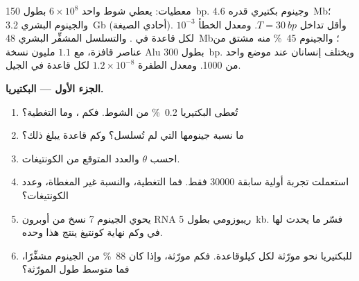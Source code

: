 \begin{problem}
\label{pb:b3:genomics:1}
معطيات: يعطي شوط واحد $6\times 10^{8}$  بطول \qty{150}{bp}.
وجينوم بكتيري قدره \qty{4.6}{Mb}؛ والجينوم البشري \qty{3.2}{Gb}
(أحادي الصيغة). وأقل تداخل $T = \qty{30}{bp}$. ومعدل الخطأ $10^{-3}$
لكل قاعدة في . والتسلسل المشفِّر البشري \qty{48}{Mb}؛ والجينوم
\qty{45}{\%} منه مشتق من عناصر قافزة، مع $1.1$ مليون نسخة Alu بطول
\qty{300}{bp}. ويختلف إنسانان عند موضع واحد من \num{1000}. ومعدل
الطفرة $1.2\times 10^{-8}$ لكل قاعدة في الجيل.

\medskip
\noindent\textbf{الجزء الأول --- البكتيريا.}
\begin{enumerate}
  \item تُعطى البكتيريا \qty{0.2}{\%} من الشوط. فكم ، وما
        التغطية؟
  \item ما نسبة جينومها التي لم تُسلسل؟ وكم قاعدة يبلغ
        ذلك؟
  \item احسب $\theta$ والعدد المتوقع من الكونتيغات.
  \item استعملت تجربة أولية سابقة \num{30000}  فقط. فما التغطية،
        والنسبة غير المغطاة، وعدد الكونتيغات؟
  \item يحوي الجينوم \num{7} نسخ من أوبرون RNA ريبوزومي بطول
        \qty{5}{kb}. فسّر ما يحدث لها في  وكم
        نهاية كونتيغ ينتج هذا وحده.
  \item للبكتيريا نحو مورّثة لكل كيلوقاعدة. فكم مورّثة،
        وإذا كان \qty{88}{\%} من الجينوم مشفِّرًا، فما متوسط طول
        المورّثة؟
\end{enumerate}


\end{problem}

